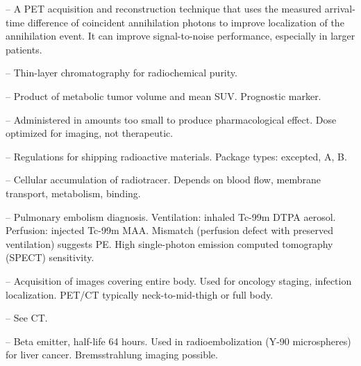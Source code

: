 -- A PET acquisition and reconstruction technique that uses the measured arrival-time difference of coincident annihilation photons to improve localization of the annihilation event. It can improve signal-to-noise performance, especially in larger patients.

-- Thin-layer chromatography for radiochemical purity.

-- Product of metabolic tumor volume and mean SUV. Prognostic marker.

-- Administered in amounts too small to produce pharmacological effect. Dose optimized for imaging, not therapeutic.

-- Regulations for shipping radioactive materials. Package types: excepted, A, B.

-- Cellular accumulation of radiotracer. Depends on blood flow, membrane transport, metabolism, binding.

-- Pulmonary embolism diagnosis. Ventilation: inhaled Tc-99m DTPA aerosol. Perfusion: injected Tc-99m MAA. Mismatch (perfusion defect with preserved ventilation) suggests PE. High single-photon emission computed tomography (SPECT) sensitivity.

-- Acquisition of images covering entire body. Used for oncology staging, infection localization. PET/CT typically neck-to-mid-thigh or full body.

-- See CT.

-- Beta emitter, half-life 64 hours. Used in radioembolization (Y-90 microspheres) for liver cancer. Bremsstrahlung imaging possible.

